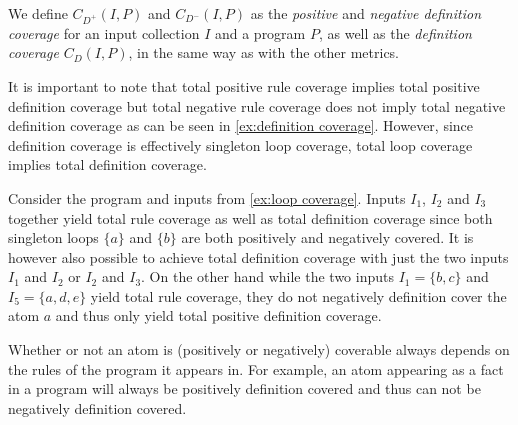 We define \(C_{D^+}(I, P)\) and \(C_{D^-}(I, P)\) as the \emph{positive} and \emph{negative definition coverage} for an input collection $I$ and a program $P$, as well as the \emph{definition coverage} \(C_D(I, P)\), in the same way as with the other metrics.

It is important to note that total positive rule coverage implies total positive definition coverage but total negative rule coverage does not imply total negative definition coverage as can be seen in \cref{ex:definition coverage}. However, since definition coverage is effectively singleton loop coverage, total loop coverage implies total definition coverage.

\begin{example}
\label{ex:definition coverage}
    Consider the program and inputs from \cref{ex:loop coverage}. Inputs $I_1$, $I_2$ and $I_3$ together yield total rule coverage as well as total definition coverage since both singleton loops \(\{a\}\) and \(\{b\}\) are both positively and negatively covered. It is however also possible to achieve total definition coverage with just the two inputs $I_1$ and $I_2$ or $I_2$ and $I_3$. On the other hand while the two inputs \(I_1 = \{b, c\}\) and \(I_5 = \{a, d, e\}\) yield total rule coverage, they do not negatively definition cover the atom $a$ and thus only yield total positive definition coverage.
\end{example}

Whether or not an atom is (positively or negatively) coverable always depends on the rules of the program it appears in. For example, an atom appearing as a fact in a program will always be positively definition covered and thus can not be negatively definition covered.

\begin{comment}
    - 2 ways to introduce definition coverage:  \/
        
        - as a coverage metric for singleton loops (minimal loops) and therefore a special case of loop coverage        \/
    
        - as a representation of the disjunctions in the program (if an atom "a" is defined in multiple rules you could rewrite this as a if B1 v B2 v ...) -> this coverage metric covers these implicit disjunctions
    -> discuss both but in which order?     \/
    
    - Definition + example      \/
    
    (- this is different to rule coverage! -> total positive rule coverage implies total positive definition coverage, not the other way around and no connection for negative coverage!       \/
    
    - total loop coverage implies total definition coverage     \/
    
    - total program coverage implies total definition coverage)
\end{comment}

